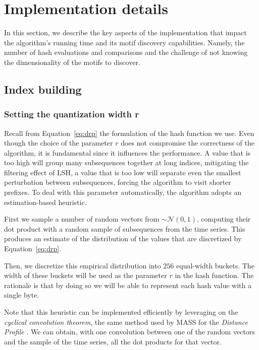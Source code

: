 \section{Implementation details}
\label{sec:opti}
In this section, we describe the key aspects of the implementation that impact the algorithm's running time and its motif discovery capabilities. Namely, the number of hash evaluations and comparisons and the challenge of not knowing the dimensionality of the motifs to discover.
\subsection{Index building}
\subsubsection*{Setting the quantization width r}
\label{sec:r_auto}
Recall from Equation~\ref{eq:drp} the formulation of the hash function we use.
Even though the choice of the parameter $r$ does not compromise the correctness of the algorithm, it is fundamental since it influences the performance.
A value that is too high will group many subsequences together at long indices, mitigating the filtering effect of LSH, a value that is too low will separate even the smallest perturbation between subsequences, forcing the algorithm to visit shorter prefixes.
To deal with this parameter automatically, the algorithm adopts an estimation-based heuristic.

First we sample a number of random vectors from $\sim \mathcal{N}(0,1)$, computing their dot product with a random sample of subsequences from the time series.
This produces an estimate of the distribution of the values that are discretized by Equation~\ref{eq:drp}.

Then, we discretize this empirical distribution into $256$ equal-width buckets.
The width of these buckets will be used as the parameter $r$ in the hash function.
The rationale is that by doing so we will be able to represent each hash value with a single byte.


Note that this heuristic can be implemented efficiently by leveraging on the \emph{cyclical convolution theorem}, the same method used by MASS for the \textit{Distance Profile} \cite{zhong2024mass}.
We can obtain, with one convolution between one of the random vectors and the sample of the time series, all the dot products for that vector.


